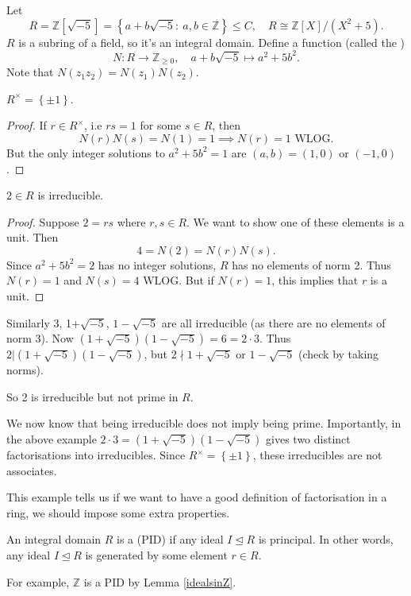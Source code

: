 \documentclass[egregdoesnotlikesansseriftitles,a4paper]{scrartcl}
\begin{document}
\begin{example*}
       Let \[
            R=\mathbb{Z}[\sqrt{-5}]= \left\{a+b\sqrt{-5} : \ a,b \in \mathbb{Z}\right\} \leq C, \quad R \cong \mathbb{Z}[X]/(X^2+5)
       .\] $R$ is a subring of a field, so it's an integral domain. Define a function (called the ) \[
       N: R \rightarrow \mathbb{Z}_{\geq 0}, \quad a+b \sqrt{-5} \mapsto a^2+5b^2
       .\] Note that $N (z_1 z_2 )=N (z_1 )N (z_2 )$. 
       \begin{claim}
             $R^{\times }=\left\{\pm 1\right\}$.
       \end{claim}
       \begin{proof}
             If $r \in R^{\times }$, i.e $rs =1$ for some $s \in R$, then \[
             N (r)N (s)=N (1)=1 \implies N (r)=1 \text{ WLOG} 
             .\] But the only integer solutions to $a^2+5b^2=1$ are $(a,b)=(1,0)$ or $(-1,0)$. 
       \end{proof}
       \begin{claim}
             $2 \in R$ is irreducible.
       \end{claim}
       \begin{proof}
             Suppose $2=rs $ where $r,s \in R $. We want to show one of these elements is a unit. Then \[
             4= N (2)=N (r)N (s)
             .\] Since $a^2+5b^2=2$ has no integer solutions, $R$ has no elements of norm 2. Thus $N (r)=1$ and $N (s)=4$ WLOG. But if $N (r)=1$, this implies that $r$ is a unit. 
       \end{proof}
       Similarly 3, 1+$\sqrt{-5} $, $1- \sqrt{-5} $ are all irreducible (as there are no elements of norm 3). Now $(1+\sqrt{-5} )(1-\sqrt{-5} )=6=2 \cdot 3$. Thus $2| (1+\sqrt{-5} )(1-\sqrt{-5} )$, but $2 \nmid 1+\sqrt{-5}$ or $1- \sqrt{-5} $ (check by taking norms). 
       
       So 2 is irreducible but not prime in $R$.
\end{example*}
\begin{remarks}
       We now know that being irreducible does not imply being prime. Importantly, in the above example $2 \cdot 3= (1+\sqrt{-5} )(1-\sqrt{-5} )$ gives two distinct factorisations into irreducibles. Since $R^{\times}=\left\{\pm 1\right\}$, these irreducibles are not associates.
\end{remarks}
This example tells us if we want to have a good definition of factorisation in a ring, we should impose some extra properties.
\begin{definition*}
       An integral domain $R$ is a  (PID) if any ideal $I \unlhd R$ is principal. In other words, any ideal $I \unlhd R$ is generated by some element $r \in R$.

       For example, $\mathbb{Z}$ is a PID by Lemma \ref{idealsinZ}.
\end{definition*}
\end{document}
